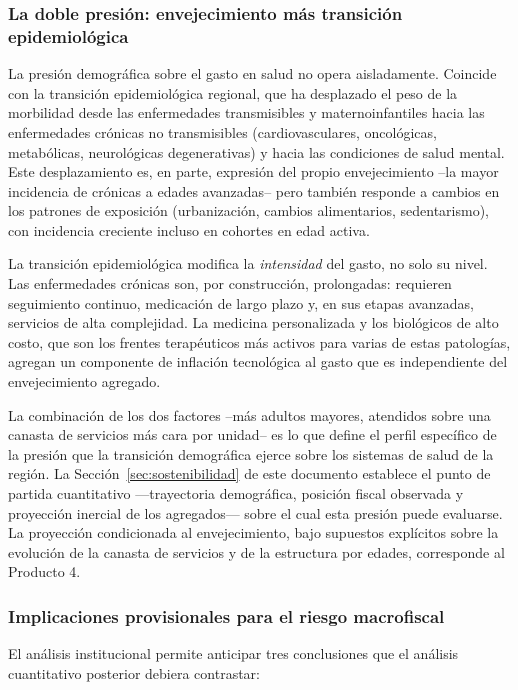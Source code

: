 \documentclass[12pt, letterpaper]{article}
\begin{document}
\subsubsection{La doble presión: envejecimiento más transición epidemiológica}

La presión demográfica sobre el gasto en salud no opera aisladamente. Coincide
con la transición epidemiológica regional, que ha desplazado el peso de la
morbilidad desde las enfermedades transmisibles y maternoinfantiles hacia las
enfermedades crónicas no transmisibles (cardiovasculares, oncológicas,
metabólicas, neurológicas degenerativas) y hacia las condiciones de salud mental.
Este desplazamiento es, en parte, expresión del propio envejecimiento --la mayor
incidencia de crónicas a edades avanzadas-- pero también responde a cambios en
los patrones de exposición (urbanización, cambios alimentarios, sedentarismo),
con incidencia creciente incluso en cohortes en edad activa.

La transición epidemiológica modifica la \textit{intensidad} del gasto, no solo su
nivel. Las enfermedades crónicas son, por construcción, prolongadas: requieren
seguimiento continuo, medicación de largo plazo y, en sus etapas avanzadas,
servicios de alta complejidad. La medicina personalizada y los biológicos de alto
costo, que son los frentes terapéuticos más activos para varias de estas
patologías, agregan un componente de inflación tecnológica al gasto que es
independiente del envejecimiento agregado.

La combinación de los dos factores --más adultos mayores, atendidos sobre una
canasta de servicios más cara por unidad-- es lo que define el perfil específico
de la presión que la transición demográfica ejerce sobre los sistemas de salud de
la región. La Sección~\ref{sec:sostenibilidad} de este documento establece el punto
de partida cuantitativo ---trayectoria demográfica, posición fiscal observada y
proyección inercial de los agregados--- sobre el cual esta presión puede evaluarse.
La proyección condicionada al envejecimiento, bajo supuestos explícitos sobre la
evolución de la canasta de servicios y de la estructura por edades, corresponde al
Producto 4.

\subsubsection{Implicaciones provisionales para el riesgo macrofiscal}

El análisis institucional permite anticipar tres conclusiones que el análisis
cuantitativo posterior debiera contrastar:
\end{document}
